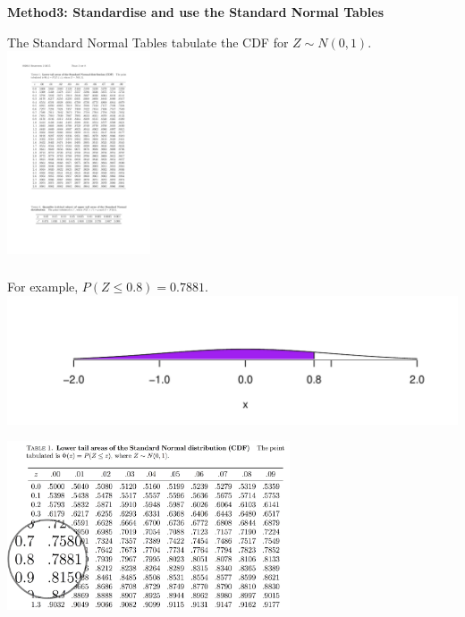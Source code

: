 \documentclass[t,xcolor=pdftex,dvipsnames,table]{beamer}\usepackage[]{graphicx}\usepackage[]{color}
\makeatletter
\def\maxwidth{ %
  \ifdim\Gin@nat@width>\linewidth
    \linewidth
  \else
    \Gin@nat@width
  \fi
}
\newenvironment{knitrout}{}{} %
\makeatother
\begin{document}
\begin{frame}[fragile]\frametitle{}

{\bf Method3: Standardise and use the Standard Normal Tables} 

\vspace{.5cm}
The Standard Normal Tables tabulate the CDF for $Z \sim N(0,1)$. \\

\vspace{.5cm}
\includegraphics[height=6cm]{../images/NormalTableSample.pdf}

\end{frame}


\begin{frame}[fragile]\frametitle{}

For example, $P(Z \leq 0.8) = 0.7881$. \\

\begin{knitrout}
\color{fgcolor}
\includegraphics[width=\maxwidth]{figure/unnamed-chunk-90-1} 

\end{knitrout}

\includegraphics[height=5cm]{../images/NormalTableEg1.jpg}
\end{frame}
\end{document}
